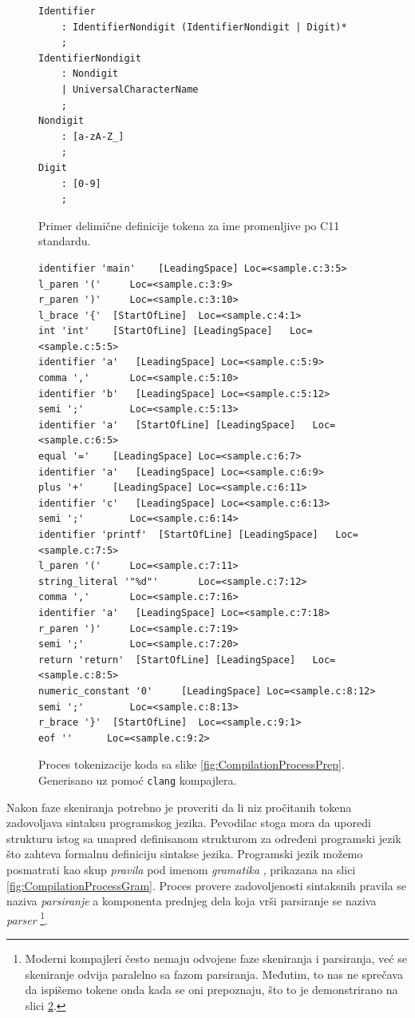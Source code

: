 \begin{figure}[h!]
\begin{lstlisting}[language={}]
Identifier 
    : IdentifierNondigit (IdentifierNondigit | Digit)*
    ;
IdentifierNondigit  
    : Nondigit
    | UniversalCharacterName
    ;
Nondigit 
    : [a-zA-Z_]
    ;
Digit 
    : [0-9]
    ;
\end{lstlisting}
\caption{Primer delimične definicije tokena za ime promenljive po C11 standardu.}
\label{fig:CLexerExample}
\end{figure}

\begin{figure}[h!]
\begin{lstlisting}[language={}]
identifier 'main'	 [LeadingSpace]	Loc=<sample.c:3:5>
l_paren '('		Loc=<sample.c:3:9>
r_paren ')'		Loc=<sample.c:3:10>
l_brace '{'	 [StartOfLine]	Loc=<sample.c:4:1>
int 'int'	 [StartOfLine] [LeadingSpace]	Loc=<sample.c:5:5>
identifier 'a'	 [LeadingSpace]	Loc=<sample.c:5:9>
comma ','		Loc=<sample.c:5:10>
identifier 'b'	 [LeadingSpace]	Loc=<sample.c:5:12>
semi ';'		Loc=<sample.c:5:13>
identifier 'a'	 [StartOfLine] [LeadingSpace]	Loc=<sample.c:6:5>
equal '='	 [LeadingSpace]	Loc=<sample.c:6:7>
identifier 'a'	 [LeadingSpace]	Loc=<sample.c:6:9>
plus '+'	 [LeadingSpace]	Loc=<sample.c:6:11>
identifier 'c'	 [LeadingSpace]	Loc=<sample.c:6:13>
semi ';'		Loc=<sample.c:6:14>
identifier 'printf'	 [StartOfLine] [LeadingSpace]	Loc=<sample.c:7:5>
l_paren '('		Loc=<sample.c:7:11>
string_literal '"%d"'		Loc=<sample.c:7:12>
comma ','		Loc=<sample.c:7:16>
identifier 'a'	 [LeadingSpace]	Loc=<sample.c:7:18>
r_paren ')'		Loc=<sample.c:7:19>
semi ';'		Loc=<sample.c:7:20>
return 'return'	 [StartOfLine] [LeadingSpace]	Loc=<sample.c:8:5>
numeric_constant '0'	 [LeadingSpace]	Loc=<sample.c:8:12>
semi ';'		Loc=<sample.c:8:13>
r_brace '}'	 [StartOfLine]	Loc=<sample.c:9:1>
eof ''		Loc=<sample.c:9:2>
\end{lstlisting}
\caption{Proces tokenizacije koda sa slike \ref{fig:CompilationProcessPrep}. Generisano uz pomoć \texttt{clang} \cite{Clang} kompajlera.}
\label{fig:CompilationProcessLex}
\end{figure}

Nakon faze skeniranja potrebno je proveriti da li niz pročitanih tokena zadovoljava sintaksu programskog jezika. Pevodilac stoga mora da uporedi strukturu istog sa unapred definisanom strukturom za određeni programski jezik što zahteva formalnu definiciju sintakse jezika. Programski jezik možemo posmatrati kao skup \emph{pravila} pod imenom \emph{gramatika} \cite{ContextFreeGrammars}, prikazana na slici \ref{fig:CompilationProcessGram}. Proces provere zadovoljenosti sintaksnih pravila se naziva \emph{parsiranje} a komponenta prednjeg dela koja vrši parsiranje se naziva \emph{parser} \footnote{Moderni kompajleri često nemaju odvojene faze skeniranja i parsiranja, već se skeniranje odvija paralelno sa fazom parsiranja. Međutim, to nas ne sprečava da ispišemo tokene onda kada se oni prepoznaju, što to je demonstrirano na slici \ref{fig:CompilationProcessLex}.}.

